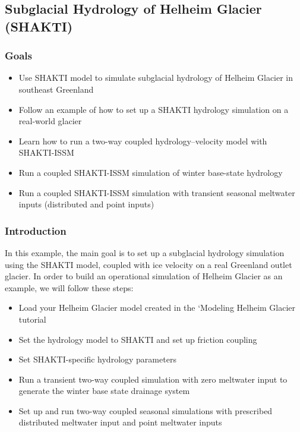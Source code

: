 
\subsection{Subglacial Hydrology of Helheim Glacier (SHAKTI)} \label{sec:using-issm-tutorials-helheimshakti}
\subsubsection{Goals}
\begin{itemize}
	\item Use SHAKTI model to simulate subglacial hydrology of Helheim Glacier in southeast Greenland
	\item Follow an example of how to set up a SHAKTI hydrology simulation on a real-world glacier
	\item Learn how to run a two-way coupled hydrology--velocity model with SHAKTI-ISSM
	\item Run a coupled SHAKTI-ISSM simulation of winter base-state hydrology
	\item Run a coupled SHAKTI-ISSM simulation with transient seasonal meltwater inputs (distributed and point inputs)
\end{itemize}

\subsubsection{Introduction}
In this example, the main goal is to set up a subglacial hydrology simulation using the SHAKTI model, coupled with ice velocity on a real Greenland outlet glacier. In order to build an operational simulation of Helheim Glacier as an example, we will follow these steps:
\begin{itemize}
	\item Load your Helheim Glacier model created in the `Modeling Helheim Glacier tutorial
	\item Set the hydrology model to SHAKTI and set up friction coupling
	\item Set SHAKTI-specific hydrology parameters
	\item Run a transient two-way coupled simulation with zero meltwater input to generate the winter base state drainage system
	\item Set up and run two-way coupled seasonal simulations with prescribed distributed meltwater input and point meltwater inputs
\end{itemize}


